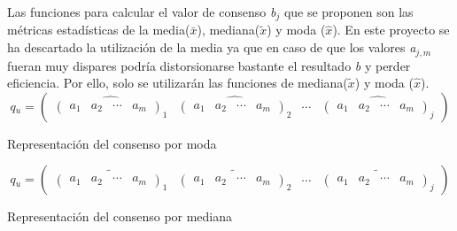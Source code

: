 Las funciones para calcular el valor de consenso \textit{b$_{j}$} que se proponen son las métricas estadísticas de la media(\(\bar{x}\)), mediana(\(\tilde{x}\)) y moda (\(\hat{x}\)). En este proyecto se ha descartado la utilización de la media ya que en caso de que los valores \textit{a$_{j, m}$} fueran muy dispares podría distorsionarse bastante el resultado \textit{b} y perder eficiencia. Por ello, solo se utilizarán las funciones de mediana(\(\tilde{x}\)) y moda (\(\hat{x}\)).
\[  \textit{q$_{u}$} = 
    \begin{pmatrix}
        \widehat{ \begin{pmatrix} a_{1}  &  a_{2}  &  \cdots   & a_{m} \end{pmatrix}_{1}} & 
        \widehat{ \begin{pmatrix} a_{1}  &  a_{2}  &  \cdots   & a_{m} \end{pmatrix}_{2}}& 
        \cdots & 
        \widehat{ \begin{pmatrix} a_{1}  &  a_{2}  &  \cdots   & a_{m} \end{pmatrix}_{j}}
    \end{pmatrix}
\]
\begin{center}
    Representación del consenso por moda
\end{center}    

\[  
    \textit{q$_{u}$} = 
    \begin{pmatrix}
        \widetilde{ \begin{pmatrix} a_{1}  &  a_{2}  &  \cdots   & a_{m} \end{pmatrix}_{1}} & 
        \widetilde{ \begin{pmatrix} a_{1}  &  a_{2}  &  \cdots   & a_{m} \end{pmatrix}_{2}}& 
        \cdots & 
        \widetilde{ \begin{pmatrix} a_{1}  &  a_{2}  &  \cdots   & a_{m} \end{pmatrix}_{j}}
    \end{pmatrix}
\]
\begin{center}
    Representación del consenso por mediana
\end{center}    

